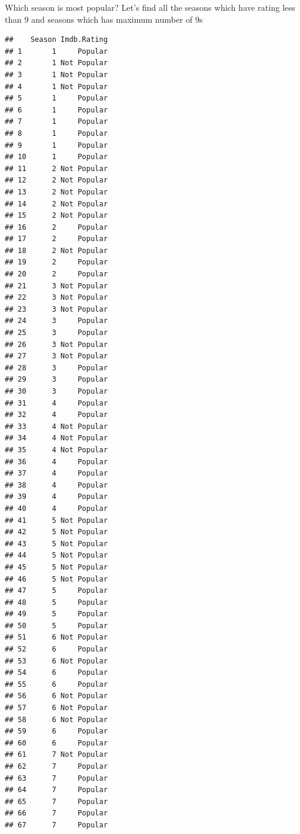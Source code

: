 \documentclass[]{article}
\newenvironment{Shaded}{\begin{snugshade}}{\end{snugshade}}
\newcommand{\CommentTok}[1]{\textcolor[rgb]{0.56,0.35,0.01}{\textit{#1}}}
\newcommand{\DecValTok}[1]{\textcolor[rgb]{0.00,0.00,0.81}{#1}}
\newcommand{\KeywordTok}[1]{\textcolor[rgb]{0.13,0.29,0.53}{\textbf{#1}}}
\newcommand{\NormalTok}[1]{#1}
\newcommand{\OperatorTok}[1]{\textcolor[rgb]{0.81,0.36,0.00}{\textbf{#1}}}
\newcommand{\StringTok}[1]{\textcolor[rgb]{0.31,0.60,0.02}{#1}}
\begin{document}
Which season is most popular? Let's find all the seasons which have
rating less than 9 and seasons which has maximum number of 9s

\begin{Shaded}
\end{Shaded}

\begin{verbatim}
##    Season Imdb.Rating
## 1       1     Popular
## 2       1 Not Popular
## 3       1 Not Popular
## 4       1 Not Popular
## 5       1     Popular
## 6       1     Popular
## 7       1     Popular
## 8       1     Popular
## 9       1     Popular
## 10      1     Popular
## 11      2 Not Popular
## 12      2 Not Popular
## 13      2 Not Popular
## 14      2 Not Popular
## 15      2 Not Popular
## 16      2     Popular
## 17      2     Popular
## 18      2 Not Popular
## 19      2     Popular
## 20      2     Popular
## 21      3 Not Popular
## 22      3 Not Popular
## 23      3 Not Popular
## 24      3     Popular
## 25      3     Popular
## 26      3 Not Popular
## 27      3 Not Popular
## 28      3     Popular
## 29      3     Popular
## 30      3     Popular
## 31      4     Popular
## 32      4     Popular
## 33      4 Not Popular
## 34      4 Not Popular
## 35      4 Not Popular
## 36      4     Popular
## 37      4     Popular
## 38      4     Popular
## 39      4     Popular
## 40      4     Popular
## 41      5 Not Popular
## 42      5 Not Popular
## 43      5 Not Popular
## 44      5 Not Popular
## 45      5 Not Popular
## 46      5 Not Popular
## 47      5     Popular
## 48      5     Popular
## 49      5     Popular
## 50      5     Popular
## 51      6 Not Popular
## 52      6     Popular
## 53      6 Not Popular
## 54      6     Popular
## 55      6     Popular
## 56      6 Not Popular
## 57      6 Not Popular
## 58      6 Not Popular
## 59      6     Popular
## 60      6     Popular
## 61      7 Not Popular
## 62      7     Popular
## 63      7     Popular
## 64      7     Popular
## 65      7     Popular
## 66      7     Popular
## 67      7     Popular
\end{verbatim}
\end{document}
